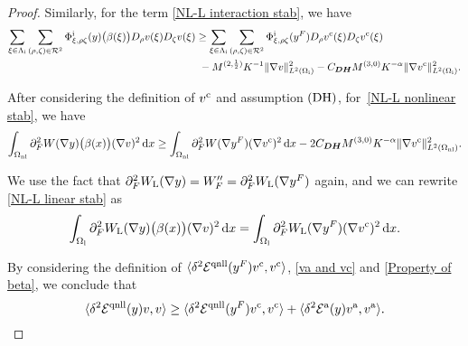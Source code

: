 \begin{proof}
	Similarly, for the term \eqref{NL-L interaction stab}, we have
	\begin{equation}\label{NL-L interaction stab result}
		\begin{split}
			\sum_{\xi \in \Lambda_{\rm i}} \sum_{(\rho,\zeta)\in\mathcal{R}^{2}} \Phi^{{\rm i}}_{\xi,\rho\zeta} (y)\big(\beta(\xi)\big)D_{\rho}v(\xi)D_{\zeta}v(\xi) &\ge \sum_{\xi \in \Lambda_{\rm i}} \sum_{(\rho,\zeta)\in\mathcal{R}^{2}} \Phi^{{\rm i}}_{\xi,\rho\zeta} (y^{F})D_{\rho}v^{\text{c}}(\xi)D_{\zeta}v^{\text{c}}(\xi) \\
			&\ - M^{(2,\frac{1}{2})} K^{-1} \Vert \nabla v \Vert_{L^{2}(\Omega_{{\rm i}})}^{2}-C_{\bm{DH}} M^{(3,0)}  K^{-\alpha} \Vert\nabla v^{\text{c}} \Vert_{L^{2}(\Omega_{{\rm i}})}^{2}.
		\end{split}
	\end{equation}
	
	After considering the definition of $v^{\text{c}}$ and assumption $\textbf{\rm (DH)}$, for~\eqref{NL-L nonlinear stab}, we have 
	\begin{equation}\label{NL-L nonlinear stab result}
		\int_{\Omega_{{\rm nl}}} \partial_{F}^{2}W (\nabla y)\big(\beta(x)\big)(\nabla v)^{2}\,\text{d} x \ge 	\int_{\Omega_{{\rm nl}}} \partial_{F}^{2}W (\nabla y^{F})(\nabla v^{\text{c}})^{2}\,\text{d} x - 2C_{\bm{DH}} M^{(3,0)}  K^{-\alpha} \Vert \nabla v^{\text{c}} \Vert_{L^{2}(\Omega_{{\rm nl}})}^{2}.
	\end{equation}
	
	
	We use the fact that $\partial_{F}^{2}W_{{\rm L}} (\nabla y) = W^{\prime \prime}_F = \partial_{F}^{2}W_{{\rm L}} (\nabla y^{F})$ again, and we can rewrite \eqref{NL-L linear stab} as
	\begin{equation}\label{NL-L linear stab result}
		\int_{\Omega_{{\rm l}}}\partial_{F}^{2}W_{{\rm L}} (\nabla y)\big(\beta(x)\big) (\nabla v)^{2} \,\text{d} x = \int_{\Omega_{{\rm l}}}\partial_{F}^{2}W_{{\rm L}} (\nabla y^{F}) (\nabla v^{\text{c}})^{2} \,\text{d} x.
	\end{equation}
	
	
	
	By considering the definition of $\langle \delta^{2} \mathcal{E}^{{\rm qnll}} (y^{F}) v^{\text{c}},v^{\text{c}} \rangle$, \eqref{va and vc} and \eqref{Property of beta}, we conclude that 
	\begin{equation*}
		\langle \delta^{2} \mathcal{E}^{{\rm qnll}} (y)v,v\rangle \ge \langle \delta^{2} \mathcal{E}^{{\rm qnll}} (y^{F}) v^{\text{c}},v^{\text{c}} \rangle + \langle \delta^{2}\mathcal{E}^{{\rm a}}(y)v^{\text{a}},v^{\text{a}} \rangle.
	\end{equation*}
	
\end{proof}

